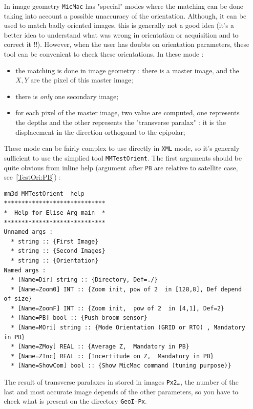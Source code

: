 In image geometry {\tt MicMac} has "special" modes where the matching can be done
taking into account a possible unaccuracy of the orientation. Although, it can be used
to match badly oriented images, this is generally not a good idea (it's a better idea to
understand what was wrong in orientation or acquisition and to correct it !!). However,
when the user has doubts on orientation parameters, these tool can  be convenient to check
these orientations. In these mode :

\begin{itemize}
   \item the matching is done in image geometry : there is a master image, and the $X,Y$
         are the pixel of this master image;
   \item there is \emph{only} one secondary image;
   \item for each pixel of the master image, two value are computed, one represents the depths
         and the other represents the "transverse paralax" : it is the displacement in the direction
         orthogonal to the epipolar;
\end{itemize}

These mode can be fairly complex to use directly in {\tt XML} mode, so it's generaly sufficient
to use the simplied tool {\tt MMTestOrient}. The  first arguments should be quite obvious from
inline help (argument after {\tt PB} are relative to satellite case, see~\ref{TestOri:PB}) :

\begin{verbatim}
mm3d MMTestOrient -help
*****************************
*  Help for Elise Arg main  *
*****************************
Unnamed args : 
  * string :: {First Image}
  * string :: {Second Images}
  * string :: {Orientation}
Named args : 
  * [Name=Dir] string :: {Directory, Def=./}
  * [Name=Zoom0] INT :: {Zoom init, pow of 2  in [128,8], Def depend of size}
  * [Name=ZoomF] INT :: {Zoom init,  pow of 2  in [4,1], Def=2}
  * [Name=PB] bool :: {Push broom sensor}
  * [Name=MOri] string :: {Mode Orientation (GRID or RTO) , Mandatory in PB}
  * [Name=ZMoy] REAL :: {Average Z,  Mandatory in PB}
  * [Name=ZInc] REAL :: {Incertitude on Z,  Mandatory in PB}
  * [Name=ShowCom] bool :: {Show MicMac command (tuning purpose)}
\end{verbatim}

The result of transverse paralaxes in stored in images {\tt Px2\dots}, the number of the last
and most accurate image depends of the other parameters, so you have to check what is 
present on the directory {\tt GeoI-Px}. 

